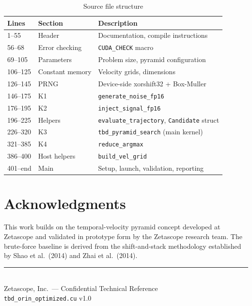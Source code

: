 \documentclass[11pt,letterpaper]{article}
\begin{document}
\begin{table}[h]
\centering
\caption{Source file structure}
\label{tab:files}
\begin{tabular}{lll}
\toprule
\textbf{Lines} & \textbf{Section} & \textbf{Description} \\
\midrule
1--55      & Header           & Documentation, compile instructions \\
56--68     & Error checking   & \texttt{CUDA\_CHECK} macro \\
69--105    & Parameters       & Problem size, pyramid configuration \\
106--125   & Constant memory  & Velocity grids, dimensions \\
126--145   & PRNG             & Device-side xorshift32 + Box-Muller \\
146--175   & K1               & \texttt{generate\_noise\_fp16} \\
176--195   & K2               & \texttt{inject\_signal\_fp16} \\
196--225   & Helpers          & \texttt{evaluate\_trajectory}, \texttt{Candidate} struct \\
226--320   & K3               & \texttt{tbd\_pyramid\_search} (main kernel) \\
321--385   & K4               & \texttt{reduce\_argmax} \\
386--400   & Host helpers     & \texttt{build\_vel\_grid} \\
401--end   & Main             & Setup, launch, validation, reporting \\
\bottomrule
\end{tabular}
\end{table}


\section*{Acknowledgments}

This work builds on the temporal-velocity pyramid concept developed at
Zetascope and validated in prototype form by the Zetascope research
team. The brute-force baseline is derived from the shift-and-stack
methodology established by Shao et al.\ (2014) and Zhai et al.\ (2014).

\vfill
\begin{center}
\color{gray}\small
\rule{0.5\textwidth}{0.4pt}\\[4pt]
Zetascope, Inc.\ --- Confidential Technical Reference\\
\texttt{tbd\_orin\_optimized.cu} v1.0
\end{center}
\end{document}
